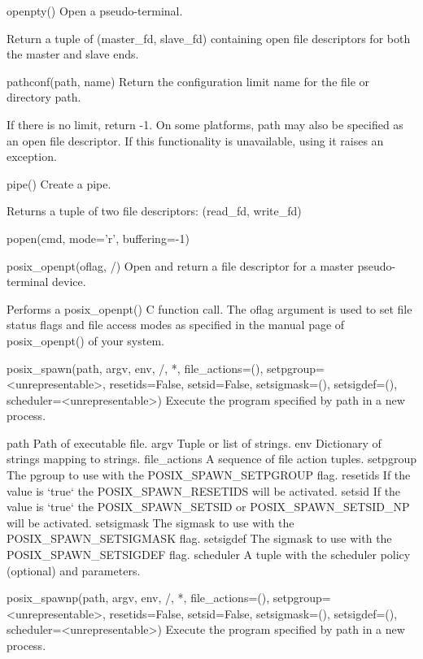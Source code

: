 \documentclass{article}
\begin{document}
    openpty()
        Open a pseudo-terminal.

        Return a tuple of (master_fd, slave_fd) containing open file descriptors
        for both the master and slave ends.

    pathconf(path, name)
        Return the configuration limit name for the file or directory path.

        If there is no limit, return -1.
        On some platforms, path may also be specified as an open file descriptor.
          If this functionality is unavailable, using it raises an exception.

    pipe()
        Create a pipe.

        Returns a tuple of two file descriptors:
          (read_fd, write_fd)

    popen(cmd, mode='r', buffering=-1)

    posix_openpt(oflag, /)
        Open and return a file descriptor for a master pseudo-terminal device.

        Performs a posix_openpt() C function call. The oflag argument is used to
        set file status flags and file access modes as specified in the manual page
        of posix_openpt() of your system.

    posix_spawn(path, argv, env, /, *, file_actions=(),
                setpgroup=<unrepresentable>, resetids=False, setsid=False,
                setsigmask=(), setsigdef=(), scheduler=<unrepresentable>)
        Execute the program specified by path in a new process.

        path
          Path of executable file.
        argv
          Tuple or list of strings.
        env
          Dictionary of strings mapping to strings.
        file_actions
          A sequence of file action tuples.
        setpgroup
          The pgroup to use with the POSIX_SPAWN_SETPGROUP flag.
        resetids
          If the value is `true` the POSIX_SPAWN_RESETIDS will be activated.
        setsid
          If the value is `true` the POSIX_SPAWN_SETSID or POSIX_SPAWN_SETSID_NP will be activated.
        setsigmask
          The sigmask to use with the POSIX_SPAWN_SETSIGMASK flag.
        setsigdef
          The sigmask to use with the POSIX_SPAWN_SETSIGDEF flag.
        scheduler
          A tuple with the scheduler policy (optional) and parameters.

    posix_spawnp(path, argv, env, /, *, file_actions=(),
                 setpgroup=<unrepresentable>, resetids=False, setsid=False,
                 setsigmask=(), setsigdef=(), scheduler=<unrepresentable>)
        Execute the program specified by path in a new process.
\end{document}
